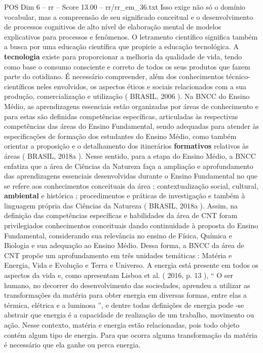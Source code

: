 \begin{textsample}{POS Dim 6 – rr – Score 13.00 – rr/rr\_em\_36.txt}
Isso exige não só o domínio vocabular, mas a compreensão de seu significado conceitual e o desenvolvimento de processos cognitivos de alto nível de elaboração mental de modelos explicativos para processos e fenômenos.
O letramento científico significa também a busca por uma educação científica que propicie a educação tecnológica.
A \textbf{tecnologia} existe para proporcionar a melhoria da qualidade de vida, tendo como base o consumo consciente e correto de todos os seus produtos que fazem parte do cotidiano.
É necessário compreender, além dos conhecimentos técnico-científicos neles envolvidos, os aspectos éticos e sociais relacionados com a sua produção, comercialização e utilização ( BRASIL, 2006 ).
Na BNCC do Ensino Médio, as aprendizagens essenciais estão organizadas por áreas de conhecimento e para estas são definidas competências específicas, articuladas às respectivas competências das áreas do Ensino Fundamental, sendo adequadas para atender às especificações de formação dos estudantes do Ensino Médio, como também orientar a proposição e o detalhamento dos itinerários \textbf{formativos} relativos às áreas ( BRASIL, 2018a ).
Nesse sentido, para a etapa do Ensino Médio, a BNCC enfatiza que a área de Ciências da Natureza faça a ampliação e aprofundamento das aprendizagens essenciais desenvolvidas durante o Ensino Fundamental no que se refere aos conhecimentos conceituais da área ; contextualização social, cultural, \textbf{ambiental} e histórica ; procedimentos e práticas de investigação e também à linguagem própria das Ciências da Natureza ( BRASIL, 2018a ).
Assim, na definição das competências específicas e habilidades da área de CNT foram privilegiados conhecimentos conceituais dando continuidade à proposta do Ensino Fundamental, considerando sua relevância no ensino de Física, Química e Biologia e sua adequação ao Ensino Médio.
Dessa forma, a BNCC da área de CNT propõe um aprofundamento em três unidades temáticas : Matéria e Energia, Vida e Evolução e Terra e Universo.
A energia está presente em todos os aspectos da vida e, como apresentam Lisboa et al. ( 2016, p. 13 ), “ O ser humano, no decorrer do desenvolvimento das sociedades, aprendeu a utilizar as transformações da matéria para obter energia em diversas formas, entre elas a térmica, elétrica e a luminosa ”, e dentre todas definições de energia pode -se abstrair que energia é a capacidade de realização de um trabalho, movimento ou ação.
Nesse contexto, matéria e energia estão relacionadas, pois todo objeto contém algum tipo de energia.
Para que ocorra alguma transformação da matéria é necessário que ela ganhe ou perca energia.

\end{textsample}
